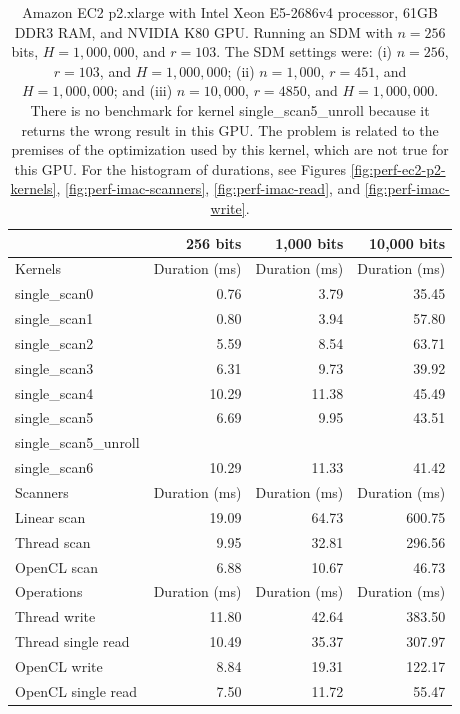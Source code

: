 


\begin{table}[!htb]
\centering
\begin{tabular}{lrrr}
    \toprule
    & \textbf{256 bits} & \textbf{1,000 bits} & \textbf{10,000 bits} \\ \hline
	\hline
	Kernels & Duration (ms) & Duration (ms) & Duration (ms) \\ \hline
    single\_scan0 &  0.76 &  3.79 & 35.45 \\
    single\_scan1 &  0.80 &  3.94 & 57.80 \\
    single\_scan2 &  5.59 &  8.54 & 63.71 \\
    single\_scan3 &  6.31 &  9.73 & 39.92 \\
    single\_scan4 & 10.29 & 11.38 & 45.49 \\
    single\_scan5 &  6.69 &  9.95 & 43.51 \\
	single\_scan5\_unroll & & & \\
    single\_scan6 & 10.29 & 11.33 & 41.42 \\
    \hline
	Scanners & Duration (ms) & Duration (ms) & Duration (ms) \\ \hline
    Linear scan & 19.09 & 64.73 & 600.75 \\
    Thread scan &  9.95 & 32.81 & 296.56 \\
    OpenCL scan &  6.88 & 10.67 &  46.73 \\ \hline
    \hline
	Operations & Duration (ms) & Duration (ms) & Duration (ms) \\ \hline
    Thread write       & 11.80 & 42.64 & 383.50 \\
    Thread single read & 10.49 & 35.37 & 307.97 \\
    OpenCL write       &  8.84 & 19.31 & 122.17 \\
    OpenCL single read &  7.50 & 11.72 &  55.47 \\
    \bottomrule
\end{tabular}
\caption{Amazon EC2 p2.xlarge with Intel Xeon E5-2686v4 processor, 61GB DDR3 RAM, and NVIDIA K80 GPU. Running an SDM with $n=256$ bits, $H=1,000,000$, and $r=103$. The SDM settings were: (i) $n=256$, $r=103$, and $H=1,000,000$; (ii) $n=1,000$, $r=451$, and $H=1,000,000$; and (iii) $n=10,000$, $r=4850$, and $H=1,000,000$. There is no benchmark for kernel single\_scan5\_unroll because it returns the wrong result in this GPU. The problem is related to the premises of the optimization used by this kernel, which are not true for this GPU.
For the histogram of durations, see Figures \ref{fig:perf-ec2-p2-kernels}, \ref{fig:perf-imac-scanners}, \ref{fig:perf-imac-read}, and \ref{fig:perf-imac-write}.
\label{tab:perf-ec2-p2}}
\end{table}


